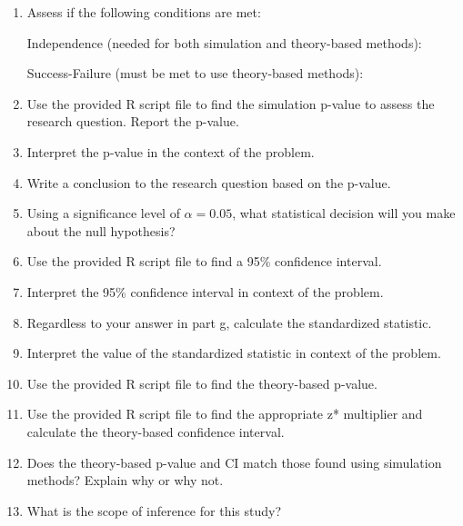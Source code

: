 \documentclass[
]{report}
\begin{document}
\begin{enumerate}
\def\labelenumi{\alph{enumi}.}
\setcounter{enumi}{6}
\item
  Assess if the following conditions are met:

  Independence (needed for both simulation and theory-based methods):
  \vspace{0.5in}

  Success-Failure (must be met to use theory-based methods):
  \vspace{0.6in}
\item
  Use the provided R script file to find the simulation p-value to assess the research question. Report the p-value.
  \vspace{0.2in}
\item
  Interpret the p-value in the context of the problem.
  \vspace{0.7in}
\item
  Write a conclusion to the research question based on the p-value.
  \vspace{0.7in}
\item
  Using a significance level of \(\alpha = 0.05\), what statistical decision will you make about the null hypothesis?
  \vspace{0.3in}
\item
  Use the provided R script file to find a 95\% confidence interval.
  \vspace{0.3in}
\item
  Interpret the 95\% confidence interval in context of the problem.
  \vspace{0.7in}
\item
  Regardless to your answer in part g, calculate the standardized statistic.
  \vspace{0.4in}
\item
  Interpret the value of the standardized statistic in context of the problem.
  \vspace{0.7in}
\item
  Use the provided R script file to find the theory-based p-value.
  \vspace{0.3in}
\item
  Use the provided R script file to find the appropriate z* multiplier and calculate the theory-based confidence interval.
  \vspace{0.5in}
\item
  Does the theory-based p-value and CI match those found using simulation methods? Explain why or why not.
  \vspace{0.7in}
\item
  What is the scope of inference for this study?
  \vspace{0.8in}
\end{enumerate}
\end{document}
